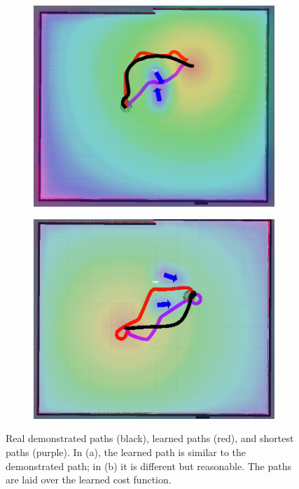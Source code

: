 \documentclass[a4paper,11pt]{report}
\begin{document}
			\begin{figure}[tbh]
	\centering
      \begin{subfigure}[b]{0.42\columnwidth}
    \includegraphics[scale=0.12]{figures/real_good_new.png}
    \caption{}
    \label{fig:res_real1}
  \end{subfigure}
  \hspace{10mm}
  \begin{subfigure}[b]{0.42\columnwidth}
  \hspace{4mm}
    \includegraphics[scale=0.12]{figures/real_reasonable_new.png}
    \caption{}
    \label{fig:res_real4}
  \end{subfigure} 
    \caption{Real demonstrated paths (black), learned paths (red), and shortest paths (purple). In (a), the learned path is similar to the demonstrated path; in (b) it is different but reasonable. The paths are laid over the learned cost function.}
    \vspace{-2mm}
  \label{fig:results_real}
  \end{figure}
\end{document}
